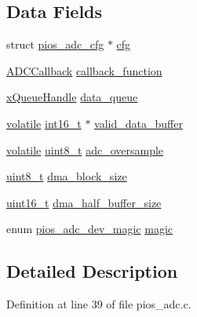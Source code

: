 \subsection*{Data Fields}
\begin{DoxyCompactItemize}
\item 
struct \hyperlink{structpios__adc__cfg}{pios\-\_\-adc\-\_\-cfg} $\ast$ \hyperlink{structpios__adc__dev_a46b6ae48c424fd83068b3e1cee0e1e2e}{cfg}
\item 
\hyperlink{group___p_i_o_s___a_d_c_ga20bf90833813c2c4945fab90c8e4f386}{A\-D\-C\-Callback} \hyperlink{structpios__adc__dev_a31e4682df8d269ef7b259a87dca032e1}{callback\-\_\-function}
\item 
\hyperlink{_common_2_libraries_2_free_r_t_o_s_2_source_2include_2queue_8h_a229037f755b756156e34a440ce134b8b}{x\-Queue\-Handle} \hyperlink{structpios__adc__dev_a50acc85db871c08a1fa88a54e11df24f}{data\-\_\-queue}
\item 
\hyperlink{group___c_m_s_i_s___core___instruction_interface_gad7d93af13046b0378601b85c8c16673b}{volatile} \hyperlink{stdint_8h_aa343fa3b3d06292b959ffdd4c4703b06}{int16\-\_\-t} $\ast$ \hyperlink{structpios__adc__dev_aef736ba3803c6e41a675eb8b447df5e7}{valid\-\_\-data\-\_\-buffer}
\item 
\hyperlink{group___c_m_s_i_s___core___instruction_interface_gad7d93af13046b0378601b85c8c16673b}{volatile} \hyperlink{stdint_8h_aba7bc1797add20fe3efdf37ced1182c5}{uint8\-\_\-t} \hyperlink{structpios__adc__dev_a04b14773a967d8f2c13d8a9ceccc0560}{adc\-\_\-oversample}
\item 
\hyperlink{stdint_8h_aba7bc1797add20fe3efdf37ced1182c5}{uint8\-\_\-t} \hyperlink{structpios__adc__dev_a9aa8302b4fd916ed43650b0a9b34e60f}{dma\-\_\-block\-\_\-size}
\item 
\hyperlink{stdint_8h_a273cf69d639a59973b6019625df33e30}{uint16\-\_\-t} \hyperlink{structpios__adc__dev_a4d5c1bf360d769f87ecfe94735683331}{dma\-\_\-half\-\_\-buffer\-\_\-size}
\item 
enum \hyperlink{group___p_i_o_s___a_d_c_gad4639b786d45b213ac842a0c4cf3e78d}{pios\-\_\-adc\-\_\-dev\-\_\-magic} \hyperlink{structpios__adc__dev_ab066aa96f4656e2fbac6a1a9edc593fc}{magic}
\end{DoxyCompactItemize}


\subsection{Detailed Description}


Definition at line 39 of file pios\-\_\-adc.\-c.



